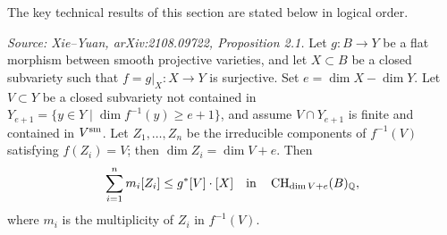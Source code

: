 The key technical results of this section are stated below in logical order.

\begin{proposition}
  \label{pro:strLeqTot}
  \textit{Source: Xie--Yuan, arXiv:2108.09722, Proposition 2.1.}
  Let \(g\colon B \to Y\) be a flat morphism between smooth projective varieties, and let
  \(X \subset B\) be a closed subvariety such that \(f = g|_X\colon X \to Y\) is surjective.
  Set \(e = \dim X - \dim Y\).
  Let \(V \subset Y\) be a closed subvariety not contained in
  \(Y_{e+1} = \{y \in Y \mid \dim f^{-1}(y) \geq e+1\}\), and assume \(V \cap Y_{e+1}\) is
  finite and contained in \(V^{\rm sm}\).
  Let \(Z_1,\dots,Z_n\) be the irreducible components of \(f^{-1}(V)\) satisfying
  \(f(Z_i)=V\); then \(\dim Z_i = \dim V + e\).
  Then
  \[
    \sum_{i=1}^n m_i [Z_i] \leq g^*[V] \cdot [X]
    \quad\text{in}\quad \operatorname{CH}_{\dim V+e}(B)_{\mathbb{Q}},
  \]
  where \(m_i\) is the multiplicity of \(Z_i\) in \(f^{-1}(V)\).
\end{proposition}

